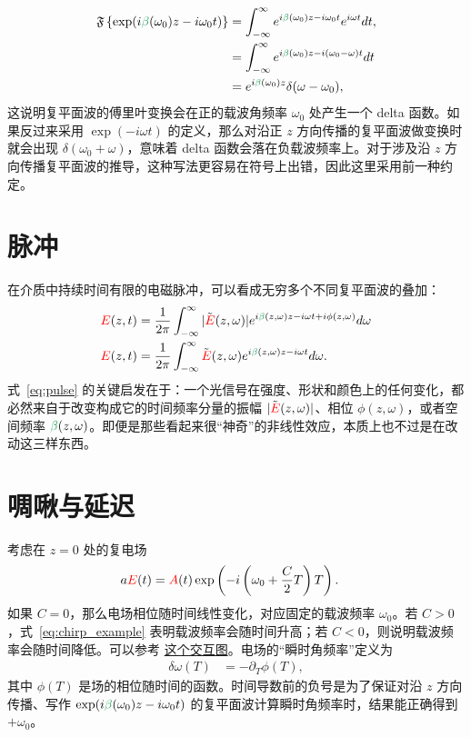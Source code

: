 \begin{align}
    \FT\left\{\exp(i\betag(\omega_0)z-i\omega_0 t)\right\} &= \int_{-\infty}^{\infty} e^{i\betag(\omega_0)z-i\omega_0 t} e^{i\omega t} dt, \\ \nonumber
      &= \int_{-\infty}^{\infty} e^{i\betag(\omega_0)z-i(\omega_0-\omega) t} dt \\ \nonumber
      &= e^{i\betag(\omega_0)z}\delta(\omega-\omega_0),
\end{align}
这说明复平面波的傅里叶变换会在正的载波角频率 $\omega_0$ 处产生一个 delta 函数。如果反过来采用 $\exp(-i\omega t)$ 的定义，那么对沿正 $z$ 方向传播的复平面波做变换时就会出现 $\delta(\omega_0+\omega)$，意味着 delta 函数会落在负载波频率上。对于涉及沿 $z$ 方向传播复平面波的推导，这种写法更容易在符号上出错，因此这里采用前一种约定。

\section{脉冲}
在介质中持续时间有限的电磁脉冲，可以看成无穷多个不同复平面波的叠加：
\begin{align}
    \label{eq:pulse}
    \E(z,t) &= \frac{1}{2\pi}\int_{-\infty}^{\infty} |\Tilde{\E}(z,\omega)| e^{i\betag(z,\omega)z-i\omega t+i\phi(z,\omega)} d\omega \\ \nonumber
    \E(z,t) &= \frac{1}{2\pi}\int_{-\infty}^{\infty} \Tilde{\E}(z,\omega) e^{i\betag(z,\omega)z-i\omega t} d\omega.
\end{align}
式~\ref{eq:pulse} 的关键启发在于：一个光信号在强度、形状和颜色上的任何变化，都必然来自于改变构成它的时间频率分量的振幅 $|\Tilde{\textcolor{red}{E}}(z,\omega)|$、相位 $\phi(z,\omega)$，或者空间频率 $\betag(z,\omega)$。即便是那些看起来很“神奇”的非线性效应，本质上也不过是在改动这三样东西。



\section{啁啾与延迟}
考虑在 $z=0$ 处的复电场
\begin{align}
\label{eq:chirp_example}
    a\textcolor{red}{E}(t) &= \textcolor{red}{A}(t)\exp\left(  -i\left(\omega_0 +\frac{C}{2}T \right)T   \right).
\end{align}
如果 $C=0$，那么电场相位随时间线性变化，对应固定的载波频率 $\omega_0$。若 $C>0$，式~\ref{eq:chirp_example} 表明载波频率会随时间升高；若 $C<0$，则说明载波频率会随时间降低。可以参考 \href{https://www.desmos.com/calculator/gd7s8nhfdn}{这个交互图}。电场的“瞬时角频率”定义为
\begin{align}
\label{eq:chirp_definition}
    \delta\omega(T) &= -\partial_T\phi(T),
\end{align}
其中 $\phi(T)$ 是场的相位随时间的函数。时间导数前的负号是为了保证对沿 $z$ 方向传播、写作 $\exp(i\betag(\omega_0)z-i\omega_0 t)$ 的复平面波计算瞬时角频率时，结果能正确得到 $+\omega_0$。

